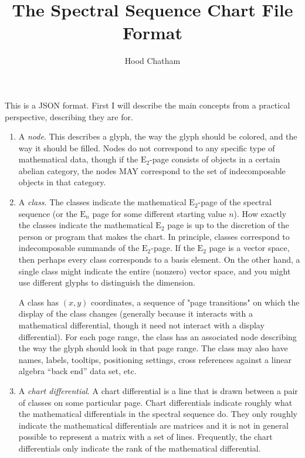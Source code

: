 \documentclass{article}
\newcommand\E{\mathrm{E}}
\begin{document}
\title{The Spectral Sequence Chart File Format}
\author{Hood Chatham}
\maketitle
This is a JSON format.
First I will describe the main concepts from a practical perspective, describing they are for.
\begin{enumerate}
\item
    A \emph{node}.
    This describes a glyph, the way the glyph should be colored, and the way it should be filled.
    Nodes do not correspond to any specific type of mathematical data, though if the $\E_2$-page consists of objects in a certain abelian category, the nodes MAY correspond to the set of indecomposable objects in that category.

\item
    A \emph{class}.
    The classes indicate the mathematical $\E_2$-page of the spectral sequence (or the $\E_n$ page for some different starting value $n$).
    How exactly the classes indicate the mathematical $\E_2$ page is up to the discretion of the person or program that makes the chart.
    In principle, classes correspond to indecomposable summands of the $\E_2$-page.
    If the $\E_2$ page is a vector space, then perhaps every class corresponds to a
    basis element.
    On the other hand, a single class might indicate the entire (nonzero) vector space, and you might use different glyphs to distinguish the dimension.

    A class has $(x,y)$ coordinates, a sequence of "page transitions" on which the display of the class changes (generally because it interacts with a mathematical differential, though it need not interact with a display differential).
    For each page range, the class has an associated node describing the way the glyph should look in that page range.
    The class may also have names, labels, tooltips, positioning settings, cross references against a linear algebra ``back end'' data set, etc.

\item
    A \emph{chart differential}.
    A chart differential is a line that is drawn between a pair of classes on some particular page.
    Chart differentials indicate roughly what the mathematical differentials in the spectral sequence do.
    They only roughly indicate the mathematical differentials are matrices and it is not in general possible to represent a matrix with a set of lines.
    Frequently, the chart differentials only indicate the rank of the mathematical differential.


\end{enumerate}
\end{document}
